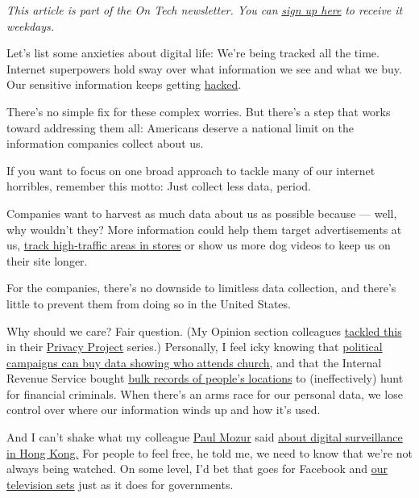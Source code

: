 \emph{This article is part of the On Tech newsletter. You can}
\href{https://www.nytimes3xbfgragh.onion/newsletters/signup/OT}{\emph{sign
up here}} \emph{to receive it weekdays.}

Let's list some anxieties about digital life: We're being tracked all
the time. Internet superpowers hold sway over what information we see
and what we buy. Our sensitive information keeps getting
\href{https://www.nytimes3xbfgragh.onion/2019/07/22/business/equifax-settlement.html}{hacked}.

There's no simple fix for these complex worries. But there's a step that
works toward addressing them all: Americans deserve a national limit on
the information companies collect about us.

If you want to focus on one broad approach to tackle many of our
internet horribles, remember this motto: Just collect less data, period.

Companies want to harvest as much data about us as possible because ---
well, why wouldn't they? More information could help them target
advertisements at us,
\href{https://www.nytimes3xbfgragh.onion/2019/03/10/business/retail-stores-technology.html}{track
high-traffic areas in stores} or show us more dog videos to keep us on
their site longer.

For the companies, there's no downside to limitless data collection, and
there's little to prevent them from doing so in the United States.

Why should we care? Fair question. (My Opinion section colleagues
\href{https://www.nytimes3xbfgragh.onion/2019/12/26/reader-center/location-tracking-phones-questions.html}{tackled
this} in their
\href{https://www.nytimes3xbfgragh.onion/interactive/2019/opinion/internet-privacy-project.html}{Privacy
Project} series.) Personally, I feel icky knowing that
\href{https://www.theverge.com/2019/7/19/20700866/steve-bannon-location-data-carriers-tmobile-att-verizon}{political
campaigns can buy data showing who attends church,} and that the
Internal Revenue Service bought
\href{https://www.wsj.com/articles/irs-used-cellphone-location-data-to-try-to-find-suspects-11592587815}{bulk
records of people's locations} to (ineffectively) hunt for financial
criminals. When there's an arms race for our personal data, we lose
control over where our information winds up and how it's used.

And I can't shake what my colleague
\href{https://www.nytimes3xbfgragh.onion/by/paul-mozur}{Paul Mozur} said
\href{https://www.nytimes3xbfgragh.onion/2020/06/12/technology/surveillance-protests-hong-kong.html}{about
digital surveillance in Hong Kong.} For people to feel free, he told me,
we need to know that we're not always being watched. On some level, I'd
bet that goes for Facebook and
\href{https://www.washingtonpost.com/technology/2019/09/18/you-watch-tv-your-tv-watches-back/}{our
television sets} just as it does for governments.

